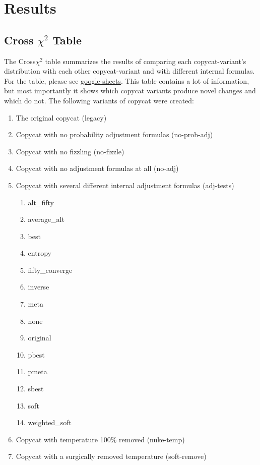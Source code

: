 \documentclass[a4paper]{article}
\begin{document}
\section{Results}

    \subsection{Cross $\chi^2$ Table}

        The Cross$\chi^2$ table summarizes the results of comparing each copycat-variant's distribution with each other copycat-variant and with different internal formulas.
        For the table, please see \href{"https://docs.google.com/spreadsheets/d/1d4EyEbWLJpLYlE7qSPPb8e1SqCAZUvtqVCd0Ns88E-8/edit?usp=sharing"}{google sheets}.
        This table contains a lot of information, but most importantly it shows which copycat variants produce novel changes and which do not.
        The following variants of copycat were created:
        \begin{enumerate}
            \item The original copycat (legacy)
            \item Copycat with no probability adjustment formulas (no-prob-adj)
            \item Copycat with no fizzling (no-fizzle)
            \item Copycat with no adjustment formulas at all (no-adj)
            \item Copycat with several different internal adjustment formulas (adj-tests)
                \begin{enumerate}
                    \item alt\_fifty
                    \item average\_alt
                    \item best
                    \item entropy
                    \item fifty\_converge
                    \item inverse
                    \item meta
                    \item none
                    \item original
                    \item pbest
                    \item pmeta
                    \item sbest
                    \item soft
                    \item weighted\_soft
                \end{enumerate}
            \item Copycat with temperature 100\% removed (nuke-temp)
            \item Copycat with a surgically removed temperature (soft-remove)
        \end{enumerate}
\end{document}
